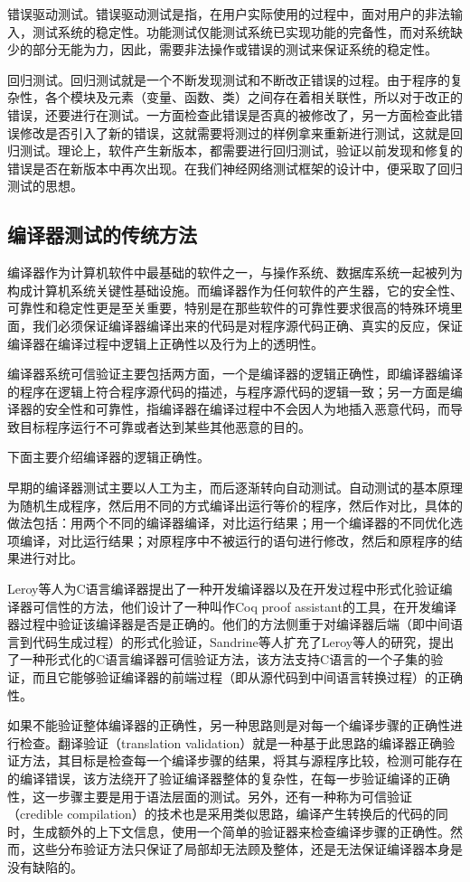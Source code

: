 错误驱动测试。错误驱动测试是指，在用户实际使用的过程中，面对用户的非法输入，测试系统的稳定性。功能测试仅能测试系统已实现功能的完备性，而对系统缺少的部分无能为力，因此，需要非法操作或错误的测试来保证系统的稳定性。

回归测试。回归测试就是一个不断发现测试和不断改正错误的过程。由于程序的复杂性，各个模块及元素（变量、函数、类）之间存在着相关联性，所以对于改正的错误，还要进行在测试。一方面检查此错误是否真的被修改了，另一方面检查此错误修改是否引入了新的错误，这就需要将测过的样例拿来重新进行测试，这就是回归测试。理论上，软件产生新版本，都需要进行回归测试，验证以前发现和修复的错误是否在新版本中再次出现。在我们神经网络测试框架的设计中，便采取了回归测试的思想。

\subsection{编译器测试的传统方法}
编译器作为计算机软件中最基础的软件之一，与操作系统、数据库系统一起被列为构成计算机系统关键性基础设施。而编译器作为任何软件的产生器，它的安全性、可靠性和稳定性更是至关重要，特别是在那些软件的可靠性要求很高的特殊环境里面，我们必须保证编译器编译出来的代码是对程序源代码正确、真实的反应，保证编译器在编译过程中逻辑上正确性以及行为上的透明性。

编译器系统可信验证主要包括两方面，一个是编译器的逻辑正确性，即编译器编译的程序在逻辑上符合程序源代码的描述，与程序源代码的逻辑一致；另一方面是编译器的安全性和可靠性，指编译器在编译过程中不会因人为地插入恶意代码，而导致目标程序运行不可靠或者达到某些其他恶意的目的。

下面主要介绍编译器的逻辑正确性。

早期的编译器测试主要以人工为主，而后逐渐转向自动测试\cite{俞甲子2008gcc}。自动测试的基本原理为随机生成程序，然后用不同的方式编译出运行等价的程序，然后作对比，具体的做法包括：用两个不同的编译器编译，对比运行结果；用一个编译器的不同优化选项编译，对比运行结果；对原程序中不被运行的语句进行修改，然后和原程序的结果进行对比。

Leroy等人\cite{hannan1992compiler}为C语言编译器提出了一种开发编译器以及在开发过程中形式化验证编译器可信性的方法，他们设计了一种叫作Coq proof assistant的工具，在开发编译器过程中验证该编译器是否是正确的。他们的方法侧重于对编译器后端（即中间语言到代码生成过程）的形式化验证，Sandrine\cite{berezin2002model}等人扩充了Leroy等人的研究，提出了一种形式化的C语言编译器可信验证方法，该方法支持C语言的一个子集的验证，而且它能够验证编译器的前端过程（即从源代码到中间语言转换过程）的正确性。

如果不能验证整体编译器的正确性，另一种思路则是对每一个编译步骤的正确性进行检查。翻译验证\cite{pnueli1998translation}（translation validation）就是一种基于此思路的编译器正确验证方法，其目标是检查每一个编译步骤的结果，将其与源程序比较，检测可能存在的编译错误，该方法绕开了验证编译器整体的复杂性，在每一步验证编译的正确性，这一步骤主要是用于语法层面的测试。另外，还有一种称为可信验证（credible compilation）\cite{rinard2003credible}的技术也是采用类似思路，编译产生转换后的代码的同时，生成额外的上下文信息，使用一个简单的验证器来检查编译步骤的正确性。然而，这些分布验证方法只保证了局部却无法顾及整体，还是无法保证编译器本身是没有缺陷的。

